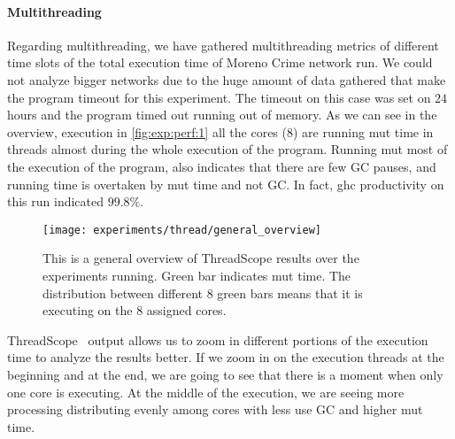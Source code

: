 \paragraph{Multithreading} Regarding multithreading, we have gathered multithreading metrics of different time slots of the total execution time of Moreno Crime network run.
We could not analyze bigger networks due to the huge amount of data gathered that make the program timeout for this experiment. The timeout on this case was set on $24$ hours and the program timed out running out of memory.
As we can see in the overview, execution in \autoref{fig:exp:perf:1} all the cores (8) are running \acrfull{mut} time in threads almost during the whole execution of the program.
Running \acrfull{mut} most of the execution of the program, also indicates that there are few GC pauses, and running time is overtaken by \acrshort{mut} time and not GC. In fact, \acrshort{ghc} productivity on this run indicated $99.8\%$.
\begin{figure}[!htb]
  \centering
  \texttt{[image: experiments/thread/general\_overview]}
  \caption[{[EE] Thread Metrics: General overview}]{This is a general overview of ThreadScope results over the experiments running. Green bar indicates \acrshort{mut} time. The distribution between different 8 green bars means that it is executing on the 8 assigned cores.}
  \label{fig:exp:perf:1}
 \end{figure}

ThreadScope~\cite{threadscope} output allows us to zoom in different portions of the execution time to analyze the results better. 
If we zoom in on the execution threads at the beginning and at the end, we are going to see that there is a moment when only one core is executing. 
At the middle of the execution, we are seeing more processing distributing evenly among cores with less use GC and higher \acrshort{mut} time.


